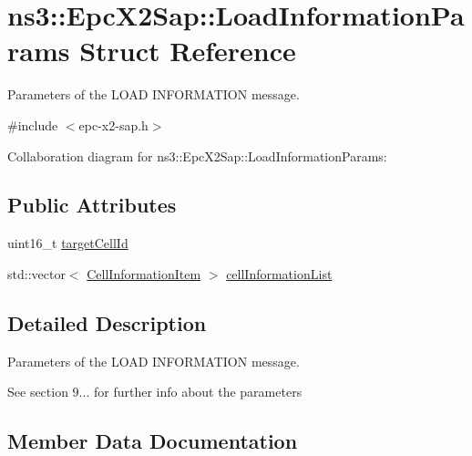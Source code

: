 \hypertarget{structns3_1_1EpcX2Sap_1_1LoadInformationParams}{}\section{ns3\+:\+:Epc\+X2\+Sap\+:\+:Load\+Information\+Params Struct Reference}
\label{structns3_1_1EpcX2Sap_1_1LoadInformationParams}


Parameters of the L\+O\+AD I\+N\+F\+O\+R\+M\+A\+T\+I\+ON message.  




{\ttfamily \#include $<$epc-\/x2-\/sap.\+h$>$}



Collaboration diagram for ns3\+:\+:Epc\+X2\+Sap\+:\+:Load\+Information\+Params\+:
\subsection*{Public Attributes}
\begin{DoxyCompactItemize}
\item 
uint16\+\_\+t \hyperlink{structns3_1_1EpcX2Sap_1_1LoadInformationParams_ae27357b920fef98c007d4a6a2fd5ee65}{target\+Cell\+Id}
\item 
std\+::vector$<$ \hyperlink{structns3_1_1EpcX2Sap_1_1CellInformationItem}{Cell\+Information\+Item} $>$ \hyperlink{structns3_1_1EpcX2Sap_1_1LoadInformationParams_a7af487b133b6bc27fec89b9af25c0e11}{cell\+Information\+List}
\end{DoxyCompactItemize}


\subsection{Detailed Description}
Parameters of the L\+O\+AD I\+N\+F\+O\+R\+M\+A\+T\+I\+ON message. 

See section 9... for further info about the parameters 

\subsection{Member Data Documentation}
